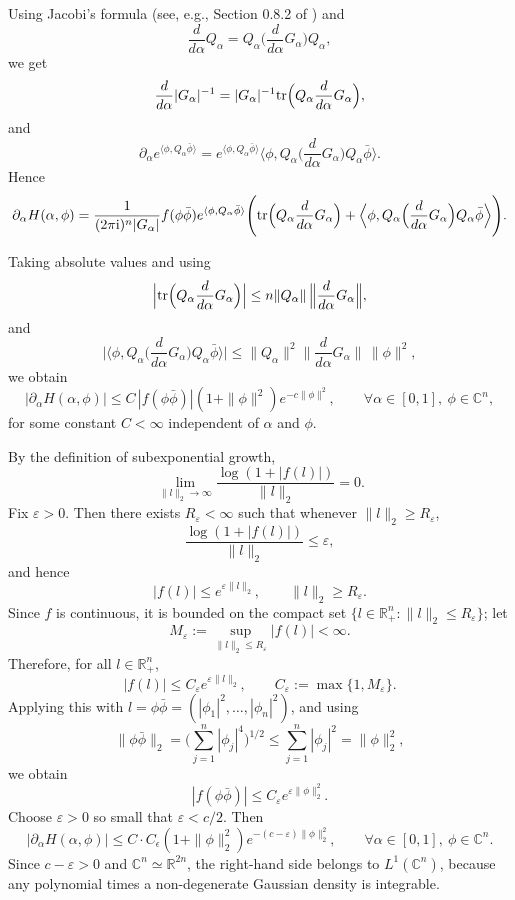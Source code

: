 \documentclass[a4paper, 11pt]{article}
\newcommand{\compi}{\textnormal{i}}
\newcommand{\tr}{\textnormal{tr}}
\begin{document}
Using Jacobi's formula (see, e.g., Section 0.8.2 of \cite{hj12}) and
\[
\frac{d}{d\alpha}Q_\alpha
= Q_\alpha\Big(\frac{d}{d\alpha}G_\alpha\Big)Q_\alpha,
\]
we get
\[
\frac{d}{d\alpha}|G_\alpha|^{-1}
= |G_\alpha|^{-1}\tr\Big(Q_\alpha\frac{d}{d\alpha}G_\alpha\Big),
\]
and
\[
\partial_\alpha e^{\langle \phi,Q_\alpha\bar\phi\rangle}
= e^{\langle \phi,Q_\alpha\bar\phi\rangle}
\Big\langle \phi,
Q_\alpha\Big(\frac{d}{d\alpha}G_\alpha\Big)Q_\alpha\bar\phi
\Big\rangle.
\]
Hence
\[
\partial_\alpha H(\alpha,\phi)
=
\frac{1}{(2\pi \compi)^n|G_\alpha|}
f(\phi\bar\phi)e^{\langle \phi,Q_\alpha\bar\phi\rangle}
\Bigg(
\tr\Big(Q_\alpha\frac{d}{d\alpha}G_\alpha\Big)
+
\Big\langle \phi,
Q_\alpha\Big(\frac{d}{d\alpha}G_\alpha\Big)Q_\alpha\bar\phi
\Big\rangle
\Bigg).
\]

Taking absolute values and using
\[
\Big|\tr\Big(Q_\alpha\frac{d}{d\alpha}G_\alpha\Big)\Big|
\le n\|Q_\alpha\|\,\Big\|\frac{d}{d\alpha}G_\alpha\Big\|,
\]
and
\[
\Big|
\Big\langle \phi,
Q_\alpha\Big(\frac{d}{d\alpha}G_\alpha\Big)Q_\alpha\bar\phi
\Big\rangle
\Big|
\le
\|Q_\alpha\|^2\Big\|\frac{d}{d\alpha}G_\alpha\Big\|\,\|\phi\|^2,
\]
we obtain
\[
|\partial_\alpha H(\alpha,\phi)|
\le
C\,|f(\phi\bar\phi)|(1+\|\phi\|^2)e^{-c\|\phi\|^2},
\qquad \forall \alpha\in[0,1],\ \phi\in\mathbb C^n,
\]
for some constant $C<\infty$ independent of $\alpha$ and $\phi$.

By the definition of subexponential growth,
\[
\lim_{\|l\|_2\to\infty}\frac{\log(1+|f(l)|)}{\|l\|_2}=0.
\]
Fix $\varepsilon>0$. Then there exists $R_\varepsilon<\infty$ such that whenever $\|l\|_2\ge R_\varepsilon$,
\[
\frac{\log(1+|f(l)|)}{\|l\|_2}\le \varepsilon,
\]
and hence
\[
|f(l)|\le e^{\varepsilon \|l\|_2},
\qquad \|l\|_2\ge R_\varepsilon.
\]
Since $f$ is continuous, it is bounded on the compact set $\{l\in\mathbb R_+^n:\|l\|_2\le R_\varepsilon\}$; let
\[
M_\varepsilon:=\sup_{\|l\|_2\le R_\varepsilon}|f(l)|<\infty.
\]
Therefore, for all $l\in\mathbb R_+^n$,
\[
|f(l)|\le C_\varepsilon e^{\varepsilon \|l\|_2},
\qquad
C_\varepsilon:=\max\{1,M_\varepsilon\}.
\]
Applying this with $l=\phi\bar\phi=(|\phi_1|^2,\dots,|\phi_n|^2)$, and using
\[
\|\phi\bar\phi\|_2
=
\Big(\sum_{j=1}^n |\phi_j|^4\Big)^{1/2}
\le
\sum_{j=1}^n |\phi_j|^2
=
\|\phi\|_2^2,
\]
we obtain
\[
|f(\phi\bar\phi)|\le C_\varepsilon e^{\varepsilon \|\phi\|_2^2}.
\]
Choose $\varepsilon>0$ so small that $\varepsilon<c/2$. Then
\[
|\partial_\alpha H(\alpha,\phi)|
\le
C\cdot C_\epsilon(1+\|\phi\|_2^2)e^{-(c-\varepsilon)\|\phi\|_2^2},
\qquad \forall \alpha\in[0,1],\ \phi\in\mathbb C^n.
\]
Since $c-\varepsilon>0$ and $\mathbb C^n\simeq\mathbb R^{2n}$, the right-hand side belongs to $L^1(\mathbb C^n)$, because any polynomial times a non-degenerate Gaussian density is integrable.
\end{document}
